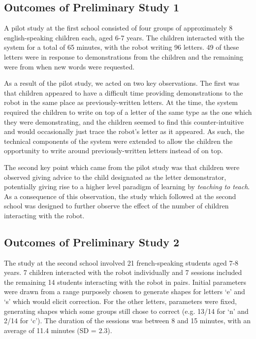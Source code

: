 \documentclass{sig-alternate}
\begin{document}
\subsection{Outcomes of Preliminary Study 1}


A pilot study at the first school consisted of four groups of
approximately 8 english-speaking children each, aged 6-7 years. The children
interacted with the system for a total of 65 minutes, with the robot writing 96
letters. 49 of these letters were in response to demonstrations from the children 
and the remaining were from when new words were requested. 

As a result of the pilot study, we acted on two key observations. The first
was that children appeared to have a difficult time providing demonstrations to
the robot in the same place as previously-written letters. At the time, the
system required the children to write on top of a letter of the same type as the
one which they were demonstrating, and the children seemed to find this
counter-intuitive and would occasionally just trace the robot's letter as it
appeared. As such, the technical components of the system were extended to allow
the children the opportunity to write around previously-written letters instead
of on top. 

The second key point which came from the pilot study was that children were
observed giving advice to the child designated as the letter demonstrator,
potentially giving rise to a higher level paradigm of learning by
\emph{teaching to teach}. As a consequence of this observation, the study which
followed at the second school was designed to further observe the effect of the
number of children interacting with the robot.

\subsection{Outcomes of Preliminary Study 2}
The study at the second school involved 21 french-speaking students aged 7-8 years. 7 children
interacted with the robot individually and 7 sessions included the remaining
14 students interacting with the robot in pairs.
Initial parameters were drawn from a range purposely chosen to generate shapes 
for letters `e' and `s' which would elicit correction. For the other letters, 
parameters were fixed, generating shapes which some groups still chose to correct 
(e.g. 13/14 for `n' and 2/14 for `c'). The duration of the sessions
was between 8 and 15 minutes, with an average of 11.4 minutes (SD = 2.3). 
\end{document}
